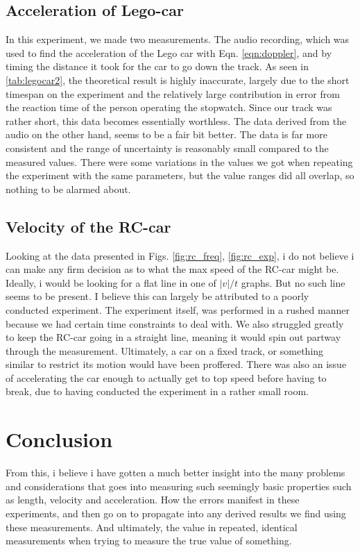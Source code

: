 \documentclass[11pt,a4paper]{article}
\begin{document}
  \subsection{Acceleration of Lego-car}
    In this experiment, we made two measurements. The audio recording, which was used to find the acceleration of the Lego car with Eqn. \ref{eqn:doppler}, and by timing the distance it took for the car to go down the track. As seen in \ref{tab:legocar2}, the theoretical result is highly inaccurate, largely due to the short timespan on the experiment and the relatively large contribution in error from the reaction time of the person operating the stopwatch. Since our track was rather short, this data becomes essentially worthless. The data derived from the audio on the other hand, seems to be a fair bit better. The data is far more consistent and the range of uncertainty is reasonably small compared to the measured values. There were some variations in the values we got when repeating the experiment with the same parameters, but the value ranges did all overlap, so nothing to be alarmed about.

  \subsection{Velocity of the RC-car}
    Looking at the data presented in Figs. \ref{fig:rc_freq}, \ref{fig:rc_exp}, i do not believe i can make any firm decision as to what the max speed of the RC-car might be. Ideally, i would be looking for a flat line in one of $|v|/t$ graphs. But no such line seems to be present. I believe this can largely be attributed to a poorly conducted experiment. The experiment itself, was performed in a rushed manner because we had certain time constraints to deal with. We also struggled greatly to keep the RC-car going in a straight line, meaning it would spin out partway through the measurement. Ultimately, a car on a fixed track, or something similar to restrict its motion would have been proffered. There was also an issue of accelerating the car enough to actually get to top speed before having to break, due to having conducted the experiment in a rather small room.

\section{\label{sec:conc}Conclusion}
  From this, i believe i have gotten a much better insight into the many problems and considerations that goes into measuring such seemingly basic properties such as length, velocity and acceleration. How the errors manifest in these experiments, and then go on to propagate into any derived results we find using these measurements. And ultimately, the value in repeated, identical measurements when trying to measure the true value of something. 
\end{document}
